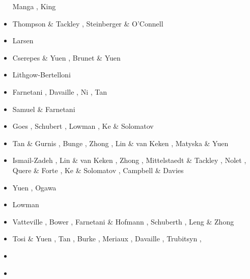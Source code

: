 \begin{scriptsize}
\begin{itemize}
                            Manga \cite{mang97}, King \cite{king97} 
\item[\nineteenninetyeight] Thompson \& Tackley \cite{thta98}, Steinberger \& O'Connell \cite{stoc98}
\item[\nineteenninetynine] Larsen \etal \cite{lays99}
\item[\twothousand] Cserepes \& Yuen \cite{csyu00}, Brunet \& Yuen \cite{bryu00}
\item[\twothousandone] Lithgow-Bertelloni \cite{lirc01}
\item[\twothousandtwo] Farnetani \etal \cite{falt02}, Davaille \etal \cite{dagl02},
                       Ni \etal \cite{nitg02}, Tan \etal \cite{tagh02}
\item[\twothousandthree] Samuel \& Farnetani \cite{safa03}
\item[\twothousandfour] Goes \etal \cite{goch04}, Schubert \etal \cite{scmo04}, Lowman \etal \cite{lokg04},
                        Ke \& Solomatov \cite{keso04} 
\item[\twothousandfive] Tan \& Gurnis \cite{tagu05}, Bunge \cite{bung05}, Zhong \cite{zhon05}, 
                        Lin \& van Keken \cite{liva05}, Matyska \& Yuen \cite{mayu05}
\item[\twothousandsix] Ismail-Zadeh \etal \cite{isst06}, Lin \& van Keken \cite{liva06a,liva06b}, 
                       Zhong \cite{zhon06}, Mittelstaedt \& Tackley \cite{mita06},
                       Nolet \etal \cite{nokm06}, Quere \& Forte \cite{qufo06}, 
                       Ke \& Solomatov \cite{keso06}, Campbell \& Davies \cite{cada06}
\item[\twothousandseven] Yuen \etal \cite{yumh07}, Ogawa \cite{ogaw07}
\item[\twothousandeight] Lowman \etal \cite{logg08} 
\item[\twothousandnine] Vatteville \etal \cite{vavl09}, Bower \etal \cite{bogj09},
                        Farnetani \& Hofmann \cite{faho09}, Schuberth \etal \cite{scbs09b},
                        Leng \& Zhong \cite{lezh09}
\item[\twothousandeleven] Tosi \& Yuen \cite{toyu11}, Tan \etal \cite{talz11},
                          Burke \cite{burk11}, Meriaux \etal \cite{memm11}, 
                          Davaille \etal \cite{dalt11}, Trubitsyn \etal \cite{tree11},
\item[\twothousandtwelve] 
\textcite{viym12} 
\item[\twothousandthirteen] 
\textcite{dagm13} \\ 

\end{itemize}
\end{scriptsize}
